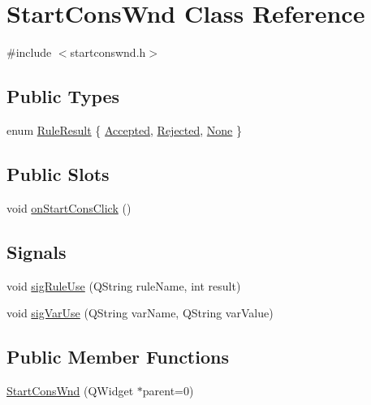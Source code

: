 \hypertarget{class_start_cons_wnd}{
\section{StartConsWnd Class Reference}
\label{class_start_cons_wnd}
}


{\ttfamily \#include $<$startconswnd.h$>$}

\subsection*{Public Types}
\begin{DoxyCompactItemize}
\item 
enum \hyperlink{class_start_cons_wnd_a22caeb063c6fbbb484d529a661024b32}{RuleResult} \{ \hyperlink{class_start_cons_wnd_a22caeb063c6fbbb484d529a661024b32ad10a0777085632b76f7e92be6841ee01}{Accepted}, 
\hyperlink{class_start_cons_wnd_a22caeb063c6fbbb484d529a661024b32a96e1f28749ebf4a4b01fa03e87e2451b}{Rejected}, 
\hyperlink{class_start_cons_wnd_a22caeb063c6fbbb484d529a661024b32a4fde57e2fdc09eb7a3798426bba70d2b}{None}
 \}
\end{DoxyCompactItemize}
\subsection*{Public Slots}
\begin{DoxyCompactItemize}
\item 
void \hyperlink{class_start_cons_wnd_abb4d9c9d3d9cfa0079c2326bc8c690d3}{onStartConsClick} ()
\end{DoxyCompactItemize}
\subsection*{Signals}
\begin{DoxyCompactItemize}
\item 
void \hyperlink{class_start_cons_wnd_a1962f8dc24e429a5da8cf9e36730d8e4}{sigRuleUse} (QString ruleName, int result)
\item 
void \hyperlink{class_start_cons_wnd_aa33463565de82bf8024e905b8bdcc857}{sigVarUse} (QString varName, QString varValue)
\end{DoxyCompactItemize}
\subsection*{Public Member Functions}
\begin{DoxyCompactItemize}
\item 
\hyperlink{class_start_cons_wnd_a3e1f8ec65afc4052134c5bc717895dbb}{StartConsWnd} (QWidget $\ast$parent=0)
\end{DoxyCompactItemize}
